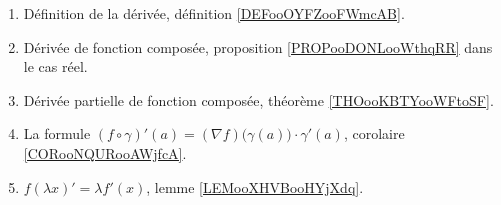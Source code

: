	\label{THEMEooDerivation}
\begin{enumerate}
	\item
	      Définition de la dérivée, définition \ref{DEFooOYFZooFWmcAB}.
	\item
	      Dérivée de fonction composée, proposition \ref{PROPooDONLooWthqRR} dans le cas réel.
	\item
	      Dérivée partielle de fonction composée, théorème \ref{THOooKBTYooWFtoSF}.
	\item
	      La formule \( (f\circ \gamma)'(a)=(\nabla f)\big( \gamma(a) \big)\cdot \gamma'(a)\), corolaire \ref{CORooNQURooAWjfcA}.
	\item
	      \( f(\lambda x)'=\lambda f'(x)\), lemme \ref{LEMooXHVBooHYjXdq}.
\end{enumerate}
